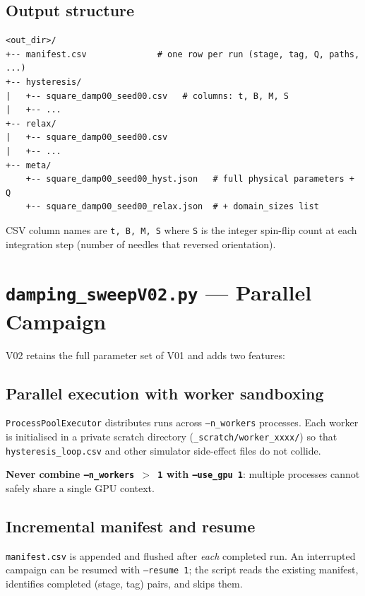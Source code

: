 \documentclass[11pt,a4paper]{article}
\newcommand{\param}[1]{\texttt{--#1}}
\newcommand{\warn}[1]{\textcolor{warnorange}{\textbf{#1}}}
\begin{document}
\subsection{Output structure}

\begin{lstlisting}
<out_dir>/
+-- manifest.csv              # one row per run (stage, tag, Q, paths, ...)
+-- hysteresis/
|   +-- square_damp00_seed00.csv   # columns: t, B, M, S
|   +-- ...
+-- relax/
|   +-- square_damp00_seed00.csv
|   +-- ...
+-- meta/
    +-- square_damp00_seed00_hyst.json   # full physical parameters + Q
    +-- square_damp00_seed00_relax.json  # + domain_sizes list
\end{lstlisting}

CSV column names are \texttt{t, B, M, S} where \texttt{S} is the integer
spin-flip count at each integration step (number of needles that reversed
orientation).

\section{\texttt{damping\_sweepV02.py} --- Parallel Campaign}
\label{sec:v02}

V02 retains the full parameter set of V01 and adds two features:

\subsection{Parallel execution with worker sandboxing}

\texttt{ProcessPoolExecutor} distributes runs across \param{n\_workers}
processes.  Each worker is initialised in a private scratch directory
(\texttt{\_scratch/worker\_xxxx/}) so that \texttt{hysteresis\_loop.csv}
and other simulator side-effect files do not collide.

\warn{Never combine \texttt{--n\_workers $>$ 1} with \texttt{--use\_gpu 1}}:
multiple processes cannot safely share a single GPU context.

\subsection{Incremental manifest and resume}

\texttt{manifest.csv} is appended and flushed after \textit{each} completed
run.  An interrupted campaign can be resumed with \param{resume~1}; the script
reads the existing manifest, identifies completed (stage, tag) pairs, and
skips them.
\end{document}
